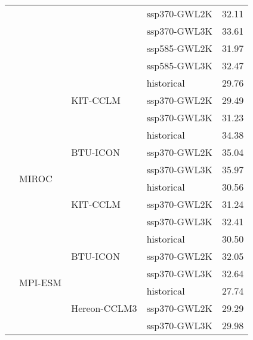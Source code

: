 \begin{table}[!htbp]
\begin{tabular}{lll|l|c}
 &  &  & ssp370-GWL2K & 32.11 \\
 &  &  & ssp370-GWL3K & 33.61 \\
 &  &  & ssp585-GWL2K & 31.97 \\
 &  &  & ssp585-GWL3K & 32.47 \\
\cmidrule(lr){3-5}
 &  & \multirow{3}{*}{KIT-CCLM} & historical & 29.76 \\
 &  &  & ssp370-GWL2K & 29.49 \\
 &  &  & ssp370-GWL3K & 31.23 \\
\cmidrule(lr){3-5}
\cmidrule(lr){2-5}
 & \multirow{6}{*}{MIROC} & \multirow{3}{*}{BTU-ICON} & historical & 34.38 \\
 &  &  & ssp370-GWL2K & 35.04 \\
 &  &  & ssp370-GWL3K & 35.97 \\
\cmidrule(lr){3-5}
 &  & \multirow{3}{*}{KIT-CCLM} & historical & 30.56 \\
 &  &  & ssp370-GWL2K & 31.24 \\
 &  &  & ssp370-GWL3K & 32.41 \\
\cmidrule(lr){3-5}
\cmidrule(lr){2-5}
 & \multirow{6}{*}{MPI-ESM} & \multirow{3}{*}{BTU-ICON} & historical & 30.50 \\
 &  &  & ssp370-GWL2K & 32.05 \\
 &  &  & ssp370-GWL3K & 32.64 \\
\cmidrule(lr){3-5}
 &  & \multirow{3}{*}{Hereon-CCLM3} & historical & 27.74 \\
 &  &  & ssp370-GWL2K & 29.29 \\
 &  &  & ssp370-GWL3K & 29.98 \\
\bottomrule
\end{tabular}
\end{table}
